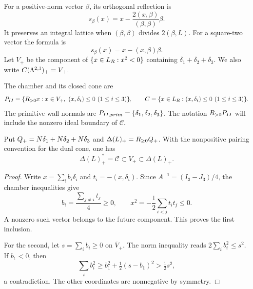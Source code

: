 For a positive-norm vector $\beta$, its orthogonal reflection is
\begin{equation}
\label{eq:bkm-kac-reflection}
 s_\beta(x)=x-\frac{2(x,\beta)}{(\beta,\beta)}\beta.
\end{equation}
It preserves an integral lattice when
$(\beta,\beta)$ divides $2(\beta,L)$. For a square-two vector the
formula is
\begin{equation}
\label{eq:bkm-square-2-reflection}
 s_\beta(x)=x-(x,\beta)\beta.
\end{equation}
Let $V_+$ be the component of $\{x\in L_{R}:x^2<0\}$ containing
$\delta_1+\delta_2+\delta_3$. We also write
$C(\Lambda^{2,1})_+=V_+$.

\begin{definition}
\label{def:bkm-type-ii-chamber}
The chamber and its closed cone are
\begin{equation}
\label{eq:bkm-poly-ii}
 P_{II}=\{R_{>0}x:x\in V_+,\ (x,\delta_i)\leq0\ (1\leq i\leq3)\},
 \qquad
 C=\{x\in L_{R}:(x,\delta_i)\leq0\ (1\leq i\leq3)\}.
\end{equation}
The primitive wall normals are
$P_{II,prim}=\{\delta_1,\delta_2,\delta_3\}$.
The notation $R_{>0}P_{II}$ will include the nonzero ideal
boundary of $\mathcal C$.
\end{definition}

\begin{lemma}
\label{lem:bkm-chamber-dual-cone}
Put $Q_+=N\delta_1+N\delta_2+N\delta_3$ and
$\Delta(L)_+=R_{\geq0}Q_+$. With the nonpositive pairing convention
for the dual cone, one has
\begin{equation}
\label{eq:bkm-chamber-dual-cone}
 \Delta(L)_+^*=\mathcal C
 \subset\overline V_+\subset\Delta(L)_+.
\end{equation}
\end{lemma}
\begin{proof}
Write $x=\sum_i b_i\delta_i$ and $t_i=-(x,\delta_i)$.
Since $A^{-1}=(I_3-J_3)/4$, the chamber inequalities give
\[
 b_i=\frac{\sum_{j\ne i}t_j}{4}\geq0,\qquad
 x^2=-\frac12\sum_{i<j}t_it_j\leq0.
\]
A nonzero such vector belongs to the future component. This proves
the first inclusion.

For the second, let $s=\sum_i b_i\geq0$ on
$\overline V_+$. The norm inequality reads
$2\sum_i b_i^2\leq s^2$. If $b_1<0$, then
\[
 \sum_i b_i^2\geq b_1^2+\tfrac12(s-b_1)^2>\tfrac12s^2,
\]
a contradiction. The other coordinates are nonnegative by symmetry.
\end{proof}

